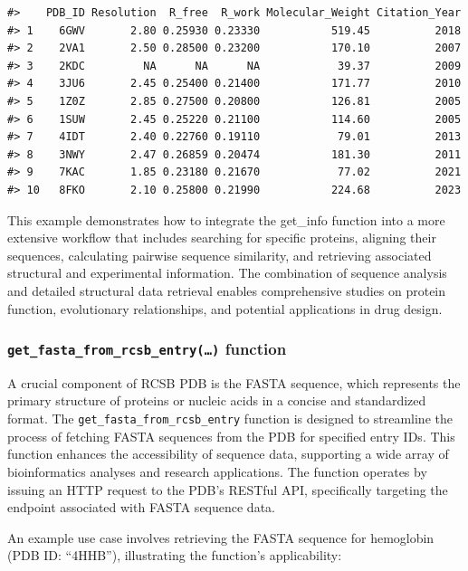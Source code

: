 \begin{verbatim}
#>    PDB_ID Resolution  R_free  R_work Molecular_Weight Citation_Year
#> 1    6GWV       2.80 0.25930 0.23330           519.45          2018
#> 2    2VA1       2.50 0.28500 0.23200           170.10          2007
#> 3    2KDC         NA      NA      NA            39.37          2009
#> 4    3JU6       2.45 0.25400 0.21400           171.77          2010
#> 5    1Z0Z       2.85 0.27500 0.20800           126.81          2005
#> 6    1SUW       2.45 0.25220 0.21100           114.60          2005
#> 7    4IDT       2.40 0.22760 0.19110            79.01          2013
#> 8    3NWY       2.47 0.26859 0.20474           181.30          2011
#> 9    7KAC       1.85 0.23180 0.21670            77.02          2021
#> 10   8FKO       2.10 0.25800 0.21990           224.68          2023
\end{verbatim}

This example demonstrates how to integrate the get\_info function into a more extensive workflow that includes searching for specific proteins, aligning their sequences, calculating pairwise sequence similarity, and retrieving associated structural and experimental information. The combination of sequence analysis and detailed structural data retrieval enables comprehensive studies on protein function, evolutionary relationships, and potential applications in drug design.

\subsubsection{\texorpdfstring{\texttt{get\_fasta\_from\_rcsb\_entry(…)} function}{get\_fasta\_from\_rcsb\_entry(\ldots) function}}\label{get_fasta_from_rcsb_entry-function}

A crucial component of RCSB PDB is the FASTA sequence, which represents the primary structure of proteins or nucleic acids in a concise and standardized format. The \texttt{get\_fasta\_from\_rcsb\_entry} function is designed to streamline the process of fetching FASTA sequences from the PDB for specified entry IDs. This function enhances the accessibility of sequence data, supporting a wide array of bioinformatics analyses and research applications. The function operates by issuing an HTTP request to the PDB's RESTful API, specifically targeting the endpoint associated with FASTA sequence data.

An example use case involves retrieving the FASTA sequence for hemoglobin (PDB ID: ``4HHB''), illustrating the function's applicability:


